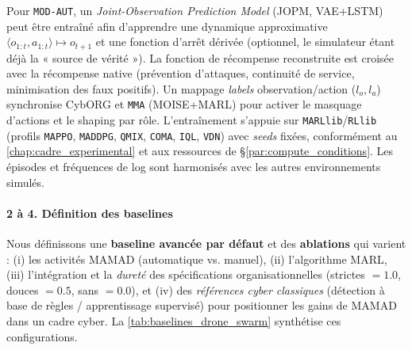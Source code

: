 Pour \texttt{MOD-AUT}, un \textit{Joint-Observation Prediction Model} (JOPM, VAE+LSTM) peut être entraîné afin d’apprendre une dynamique approximative $\langle o_{1:t}, a_{1:t} \rangle \mapsto o_{t+1}$ et une fonction d’arrêt dérivée (optionnel, le simulateur étant déjà la « source de vérité »). La fonction de récompense reconstruite est croisée avec la récompense native (prévention d’attaques, continuité de service, minimisation des faux positifs). Un mappage \emph{labels} observation/action ($l_o, l_a$) synchronise CybORG et \texttt{MMA} (MOISE+MARL) pour activer le masquage d’actions et le shaping par rôle. L’entraînement s’appuie sur \texttt{MARLlib}/\texttt{RLlib} (profils \texttt{MAPPO}, \texttt{MADDPG}, \texttt{QMIX}, \texttt{COMA}, \texttt{IQL}, \texttt{VDN}) avec \textit{seeds} fixées, conformément au \autoref{chap:cadre_experimental} et aux ressources de \S\ref{par:compute_conditions}. Les épisodes et fréquences de log sont harmonisés avec les autres environnements simulés.

\paragraph{2 à 4. Définition des baselines}

Nous définissons une \textbf{baseline avancée par défaut} et des \textbf{ablations} qui varient : (i) les activités MAMAD (automatique vs. manuel), (ii) l’algorithme MARL, (iii) l’intégration et la \textit{dureté} des spécifications organisationnelles (strictes $=1.0$, douces $=0.5$, sans $=0.0$), et (iv) des \textit{références cyber classiques} (détection à base de règles / apprentissage supervisé) pour positionner les gains de MAMAD dans un cadre cyber. La \autoref{tab:baselines_drone_swarm} synthétise ces configurations.

